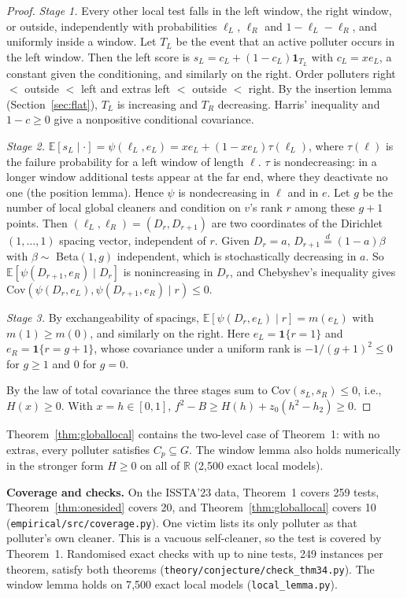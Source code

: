 \documentclass[11pt,a4paper]{article}
\theoremstyle{definition}\newtheorem{definition}[theorem]{Definition}
\theoremstyle{remark}\newtheorem{remark}[theorem]{Remark}
\newcommand{\E}{\mathbb E}
\theoremstyle{definition}\newtheorem{xexample}[xtheorem]{Example}\theoremstyle{plain}
\begin{document}
\begin{proof}
\emph{Stage 1.} Every other local test falls in the left window, the right window, or outside, independently with probabilities $\ell_L$, $\ell_R$ and $1-\ell_L-\ell_R$, and uniformly inside a window. Let $T_L$ be the event that an active polluter occurs in the left window. Then the left score is $s_L=c_L+(1-c_L)\mathbf 1_{T_L}$ with $c_L=xe_L$, a constant given the conditioning, and similarly on the right. Order polluters right $<$ outside $<$ left and extras left $<$ outside $<$ right. By the insertion lemma (Section~\ref{sec:flat}), $T_L$ is increasing and $T_R$ decreasing. Harris' inequality and $1-c\ge0$ give a nonpositive conditional covariance.

\emph{Stage 2.} $\E[s_L\mid\cdot]=\psi(\ell_L,e_L)=xe_L+(1-xe_L)\tau(\ell_L)$, where $\tau(\ell)$ is the failure probability for a left window of length $\ell$. $\tau$ is nondecreasing: in a longer window additional tests appear at the far end, where they deactivate no one (the position lemma). Hence $\psi$ is nondecreasing in $\ell$ and in $e$. Let $g$ be the number of local global cleaners and condition on $v$'s rank $r$ among these $g+1$ points. Then $(\ell_L,\ell_R)=(D_r,D_{r+1})$ are two coordinates of the Dirichlet$(1,\dots,1)$ spacing vector, independent of $r$. Given $D_r=a$, $D_{r+1}\overset{d}{=}(1-a)\beta$ with $\beta\sim$ Beta$(1,g)$ independent, which is stochastically decreasing in $a$. So $\E[\psi(D_{r+1},e_R)\mid D_r]$ is nonincreasing in $D_r$, and Chebyshev's inequality gives $\mathrm{Cov}(\psi(D_r,e_L),\psi(D_{r+1},e_R)\mid r)\le0$.

\emph{Stage 3.} By exchangeability of spacings, $\E[\psi(D_r,e_L)\mid r]=m(e_L)$ with $m(1)\ge m(0)$, and similarly on the right. Here $e_L=\mathbf 1\{r=1\}$ and $e_R=\mathbf 1\{r=g+1\}$, whose covariance under a uniform rank is $-1/(g+1)^2\le0$ for $g\ge1$ and $0$ for $g=0$.

By the law of total covariance the three stages sum to $\mathrm{Cov}(s_L,s_R)\le0$, i.e., $H(x)\ge0$. With $x=h\in[0,1]$, $f^2-B\ge H(h)+z_0(h^2-h_2)\ge0$.
\end{proof}
Theorem~\ref{thm:globallocal} contains the two-level case of Theorem~1: with no extras, every polluter satisfies $C_p\subseteq G$. The window lemma also holds numerically in the stronger form $H\ge0$ on all of $\mathbb R$ (2{,}500 exact local models).

\textbf{Coverage and checks.} On the ISSTA'23 data, Theorem~1 covers 259 tests, Theorem~\ref{thm:onesided} covers 20, and Theorem~\ref{thm:globallocal} covers 10 (\texttt{empirical/src/coverage.py}). One victim lists its only polluter as that polluter's own cleaner. This is a vacuous self-cleaner, so the test is covered by Theorem~1. Randomised exact checks with up to nine tests, 249 instances per theorem, satisfy both theorems (\texttt{theory/conjecture/check\_thm34.py}). The window lemma holds on 7{,}500 exact local models (\texttt{local\_lemma.py}).
\end{document}
